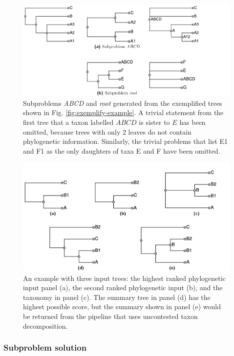 \documentclass[fleqn,12pt,lineno,english]{wlpeerj}
\begin{document}
\begin{figure}
\includegraphics[width=1.0\textwidth]{Fig6}

\caption{Subproblems \emph{ABCD} and \emph{root} generated from the exemplified trees shown in Fig. \ref{fig:exemplify-example}.
A trivial statement from the first tree that a taxon labelled $ABCD$
is sister to $E$ has been omitted, because trees with only 2 leaves
do not contain phylogenetic information.
Similarly, the trivial problems that list E1 and F1 as the only daughters
of taxa E and F have been omitted.}
\label{fig:subproblems-example}
\end{figure}
\begin{figure}
\includegraphics[width=1.0\textwidth]{Fig7}

\caption{An example with three input trees: the highest ranked phylogenetic
input panel (a), the second ranked phylogenetic input (b), and the
taxonomy in panel (c). The summary tree in panel (d) has the highest
possible score, but the summary shown in panel (e) would be returned
from the pipeline that uses uncontested taxon decomposition.}
\label{fig:decompose-worsens}
\end{figure}


\subsubsection{Subproblem solution\label{subsec:Subproblem-solution}}
\end{document}
